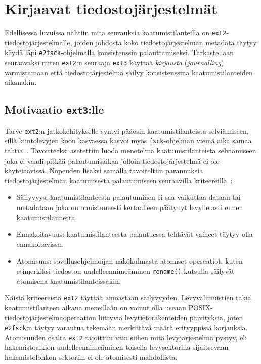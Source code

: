 \section{Kirjaavat tiedostojärjestelmät}
\label{ChapJournallingFs}
Edellisessä luvuissa nähtiin mitä seurauksia kaatumistilanteilla on \texttt{ext2}-tiedostojärjestelmälle,
joiden johdosta koko tiedostojärjestelmän metadata täytyy käydä läpi \texttt{e2fsck}-ohjelmalla konsistenssin palauttamiseksi.
Tarkastellaan seuraavaksi miten \texttt{ext2}:n seuraaja \texttt{ext3} käyttää \emph{kirjausta} (\emph{journalling}) varmistamaan että tiedostojärjestelmä säilyy konsistenssina kaatumistilanteiden aikanakin.

\subsection{Motivaatio \texttt{ext3}:lle}
Tarve \texttt{ext2}:n jatkokehitykselle syntyi pääosin kaatumistilanteista selviämiseen,
sillä kiintolevyjen koon kasvaessa kasvoi myös \texttt{fsck}-ohjelman viemä aika samaa tahtia~\cite{Ext2Journal}.
Tavoitteeksi asetettiin luoda menetelmä kaatumistilanteista selviämiseen joka ei vaadi pitkää palautumisaikaa jolloin tiedostojärjestelmä ei ole käytettävissä.
Nopeuden lisäksi samalla tavoiteltiin parannuksia tiedostojärjestelmän kaatumisesta palautumiseen seuraavilla kriteereillä~\cite{Ext2Journal}:
\begin{itemize}
    \item{Säilyvyys: kaatumistilanteesta palautuminen ei saa vaikuttaa dataan tai metadataan joka on onnistuneesti kertaalleen päätynyt levylle asti ennen kaatumistilannetta.}
    \item{Ennakoitavuus: kaatumistilanteesta palautuessa tehtävät vaiheet täytyy olla ennakoitavissa.}
    \item{Atomisuus: sovellusohjelmoijan näkökulmasta atomiset operaatiot, kuten esimerkiksi tiedoston uudelleennimeäminen \texttt{rename()}-kutsulla säilyvät atomisena kaatumistilanteissakin.}
\end{itemize}
Näistä kriteereistä \texttt{ext2} täyttää ainoastaan säilyvyyden.
Levyvälimuistien takia kaatumistilanteen aikana meneillään on voinut olla useaan POSIX-tiedostojärjestelmäoperaation liittyviä levytietorakenteiden päivityksiä,
joten \texttt{e2fsck}:n täytyy varautua tekemään merkittävä määrä erityyppisiä korjauksia.
Atomisuuden osalta \texttt{ext2} rajoittuu vain siihen mitä levyjärjestelmä pystyy,
eli hakemistoalkion uudelleennimeäminen toisella levysektorilla sijaitsevaan hakemistolohkon sektoriin ei ole atomisesti mahdollista.
%

